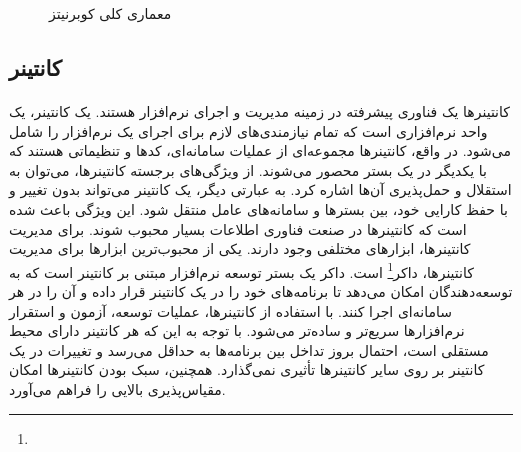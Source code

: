 {\begin{enumerate}
    \end{enumerate}
    \begin{figure}[H]
        \caption{معماری کلی کوبرنیتز}
        \label{fig:kube_compontents}
    \end{figure}
}

\subsection{کانتینر‌}
\label{subsec:containers}
\paragraph{}
{
    کانتینرها یک فناوری پیشرفته در زمینه مدیریت و اجرای نرم‌افزار هستند. یک کانتینر، یک واحد نرم‌افزاری است که تمام نیازمندی‌های
    لازم برای اجرای یک نرم‌افزار را شامل می‌شود. در واقع، کانتینرها مجموعه‌ای از عملیات سامانه‌ای، کدها و تنظیماتی هستند که با 
    یکدیگر در یک بستر محصور می‌شوند. از ویژگی‌های برجسته کانتینرها، می‌توان به استقلال و حمل‌پذیری آن‌ها اشاره کرد. به عبارتی دیگر،
    یک کانتینر می‌تواند بدون تغییر و با حفظ کارایی خود، بین بستر‌ها و سامانه‌‌های عامل‌ منتقل شود. این ویژگی باعث شده است که کانتینرها
    در صنعت فناوری اطلاعات بسیار محبوب شوند. برای مدیریت کانتینرها، ابزارهای مختلفی وجود دارند. یکی از محبوب‌ترین ابزارها برای مدیریت کانتینرها،
    داکر\footnote{}\cite{7912109}
    است. داکر یک بستر توسعه نرم‌افزار مبتنی بر کانتینر است که به توسعه‌دهندگان امکان می‌دهد تا برنامه‌های خود را در یک کانتینر قرار داده و آن را در
    هر سامانه‌ای اجرا کنند. با استفاده از کانتینرها، عملیات توسعه، آزمون و استقرار نرم‌افزارها سریع‌تر و ساده‌تر می‌شود. با توجه به این که هر کانتینر
    دارای محیط مستقلی است، احتمال بروز تداخل بین برنامه‌ها به حداقل می‌رسد و تغییرات در یک کانتینر بر روی سایر کانتینرها تأثیری نمی‌گذارد. همچنین،
    سبک بودن کانتینرها امکان مقیاس‌پذیری بالایی را فراهم می‌آورد.
}

